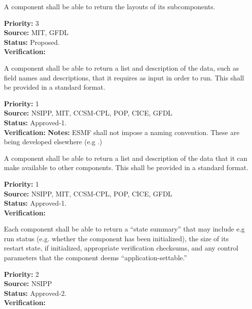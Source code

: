 A component shall be able to return the layouts of 
its subcomponents. 
\begin{reqlist}
{\bf Priority:} 3 \\
{\bf Source:} MIT, GFDL \\
{\bf Status:} Proposed. \\
{\bf Verification:} 
\end{reqlist}

A component shall be able to return a list and description of the
data, such as field names and descriptions, that it requires as input
in order to run.  This shall be provided in a standard format.

\begin{reqlist}
{\bf Priority:} 1\\
{\bf Source:} NSIPP, MIT, CCSM-CPL, POP, CICE, GFDL \\
{\bf Status:} Approved-1.\\
{\bf Verification:}  
{\bf Notes:} ESMF shall not impose a naming convention. These are
being developed elsewhere (e.g .)
\end{reqlist}

A component shall be able to return a list and description of the 
data that it can make available to other components.  This shall be
provided in a standard format.
\begin{reqlist}
{\bf Priority:} 1\\
{\bf Source:} NSIPP, MIT, CCSM-CPL, POP, CICE, GFDL \\
{\bf Status:} Approved-1.\\
{\bf Verification:} 
\end{reqlist}


Each component shall be able to return a ``state summary'' that may
include e.g run status (e.g. whether the component has been
initialized), the size of its restart state, if initialized,
appropriate verification checksums, and any control parameters that
the component deems ``application-settable.''
\begin{reqlist}
{\bf Priority:} 2\\
{\bf Source:} NSIPP \\
{\bf Status:} Approved-2.\\
{\bf Verification:} 
\end{reqlist}

